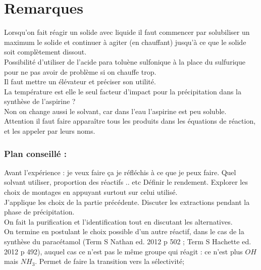 \documentclass[12pt,prb,aps,epsf]{article}
\begin{document}
\section*{Remarques}
Lorsqu'on fait réagir un solide avec liquide il faut commencer par solubiliser un maximum le solide et continuer à agiter (en chauffant) jusqu'à ce que le solide soit complètement dissout.\\

Possibilité d'utiliser de l'acide para toluène sulfonique à la place du sulfurique pour ne pas avoir de problème si on chauffe trop.\\

Il faut mettre un élévateur et préciser son utilité.\\

La température est elle le seul facteur d'impact pour la précipitation dans la synthèse de l'aspirine ?\\
Non on change aussi le solvant, car dans l'eau l'aspirine est peu soluble.\\

Attention il faut faire apparaître tous les produits dans les équations de réaction, et les appeler par leurs noms.\\

\subsubsection*{Plan conseillé :}
Avant l'expérience : je veux faire ça je réfléchis à ce que je peux faire. Quel solvant utiliser, proportion des réactifs .. etc Définir le rendement. Explorer les choix de montages en appuyant surtout sur celui utilisé.\\
J'applique les choix de la partie précédente. Discuter les extractions pendant la phase de précipitation.\\
On fait la purification et l'identification tout en discutant les alternatives.\\
On termine en postulant le choix possible d'un autre réactif, dans le cas de la synthèse du paracétamol (Term S Nathan ed. 2012 p 502 ; Term S
Hachette ed. 2012 p 492), auquel cas ce n'est pas le même groupe qui réagit : ce n'est plus $OH$ mais $NH_3$. Permet de faire la transition vers la sélectivité;
\end{document}
